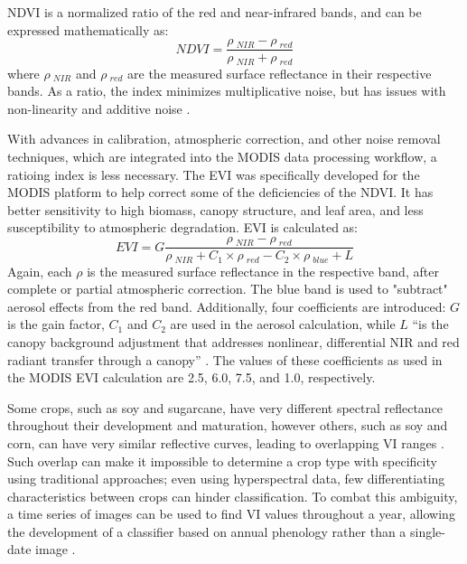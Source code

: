 NDVI is a normalized ratio of the red and near-infrared bands, and can be expressed mathematically as:
\begin{equation}
  NDVI = \frac{\rho~_{NIR} - \rho~_{red}}{\rho~_{NIR} + \rho~_{red}}
\end{equation}
where $\rho~_{NIR}$ and $\rho~_{red}$ are the measured surface reflectance in their respective bands. As a ratio, the index minimizes multiplicative noise, but has issues with non-linearity and additive noise \autocite{huete2002overview}.

With advances in calibration, atmospheric correction, and other noise removal techniques, which are integrated into the MODIS data processing workflow, a ratioing index is less necessary. The EVI was specifically developed for the MODIS platform to help correct some of the deficiencies of the NDVI. It has better sensitivity to high biomass, canopy structure, and leaf area, and less susceptibility to atmospheric degradation. EVI is calculated as:
\begin{equation}
  EVI = G\frac{\rho~_{NIR} - \rho~_{red}}{\rho~_{NIR} +  C_1\times\rho~_{red} - C_2 \times \rho~_{blue} + L}
\end{equation}
Again, each $\rho$ is the measured surface reflectance in the respective band, after complete or partial atmospheric correction. The blue band is used to "subtract" aerosol effects from the red band. Additionally, four coefficients are introduced: $G$ is the gain factor, $C_1$ and $C_2$ are used in the aerosol calculation, while $L$ ``is the canopy background adjustment that addresses nonlinear, differential NIR and red radiant transfer through a canopy'' \citereset\autocite[196]{huete2002overview}. The values of these coefficients as used in the MODIS EVI calculation are 2.5, 6.0, 7.5, and 1.0, respectively.

Some crops, such as soy and sugarcane, have very different spectral reflectance throughout their development and maturation, however others, such as soy and corn, can have very similar reflective curves, leading to overlapping VI ranges \autocite{price1994how-unique}. Such overlap can make it impossible to determine a crop type with specificity using traditional approaches; even using hyperspectral data, few differentiating characteristics between crops can hinder classification. To combat this ambiguity, a time series of images can be used to find VI values throughout a year, allowing the development of a classifier based on annual phenology rather than a single-date image \autocites{gu2010phenological}{wardlow2002discriminating}{wardlow2005state-level}{wardlow2007analysis}{wardlow2008large-area}{zhang2003monitoring}.
	
